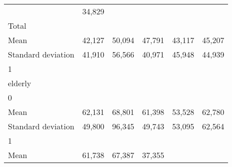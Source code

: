 \begin{tabular}{llllll}
  \multicolumn{1}{r}{} &
  \multicolumn{1}{r}{34,829} \\
\multicolumn{1}{l}{\hspace{3em}Total} &
  \multicolumn{1}{|r}{} &
  \multicolumn{1}{r}{} &
  \multicolumn{1}{r}{} &
  \multicolumn{1}{r}{} &
  \multicolumn{1}{r}{} \\
\multicolumn{1}{l}{\hspace{4em}Mean} &
  \multicolumn{1}{|r}{42,127} &
  \multicolumn{1}{r}{50,094} &
  \multicolumn{1}{r}{47,791} &
  \multicolumn{1}{r}{43,117} &
  \multicolumn{1}{r}{45,207} \\
\multicolumn{1}{l}{\hspace{4em}Standard deviation} &
  \multicolumn{1}{|r}{41,910} &
  \multicolumn{1}{r}{56,566} &
  \multicolumn{1}{r}{40,971} &
  \multicolumn{1}{r}{45,948} &
  \multicolumn{1}{r}{44,939} \\
\multicolumn{1}{l}{\hspace{1em}1} &
  \multicolumn{1}{|r}{} &
  \multicolumn{1}{r}{} &
  \multicolumn{1}{r}{} &
  \multicolumn{1}{r}{} &
  \multicolumn{1}{r}{} \\
\multicolumn{1}{l}{\hspace{2em}elderly} &
  \multicolumn{1}{|r}{} &
  \multicolumn{1}{r}{} &
  \multicolumn{1}{r}{} &
  \multicolumn{1}{r}{} &
  \multicolumn{1}{r}{} \\
\multicolumn{1}{l}{\hspace{3em}0} &
  \multicolumn{1}{|r}{} &
  \multicolumn{1}{r}{} &
  \multicolumn{1}{r}{} &
  \multicolumn{1}{r}{} &
  \multicolumn{1}{r}{} \\
\multicolumn{1}{l}{\hspace{4em}Mean} &
  \multicolumn{1}{|r}{62,131} &
  \multicolumn{1}{r}{68,801} &
  \multicolumn{1}{r}{61,398} &
  \multicolumn{1}{r}{53,528} &
  \multicolumn{1}{r}{62,780} \\
\multicolumn{1}{l}{\hspace{4em}Standard deviation} &
  \multicolumn{1}{|r}{49,800} &
  \multicolumn{1}{r}{96,345} &
  \multicolumn{1}{r}{49,743} &
  \multicolumn{1}{r}{53,095} &
  \multicolumn{1}{r}{62,564} \\
\multicolumn{1}{l}{\hspace{3em}1} &
  \multicolumn{1}{|r}{} &
  \multicolumn{1}{r}{} &
  \multicolumn{1}{r}{} &
  \multicolumn{1}{r}{} &
  \multicolumn{1}{r}{} \\
\multicolumn{1}{l}{\hspace{4em}Mean} &
  \multicolumn{1}{|r}{61,738} &
  \multicolumn{1}{r}{67,387} &
  \multicolumn{1}{r}{37,355} &

\end{tabular}
